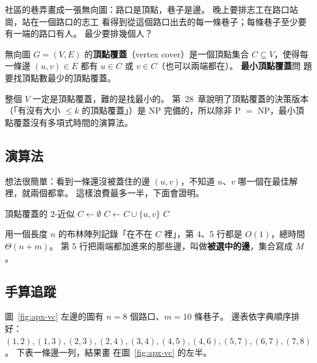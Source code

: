 社區的巷弄畫成一張無向圖：路口是頂點，巷子是邊。 晚上要排志工在路口站崗，站在一個路口的志工
看得到從這個路口出去的每一條巷子；每條巷子至少要有一端的路口有人。 最少要排幾個人？

\begin{definition}[頂點覆蓋]
\label{def:apx-vc}
無向圖 $G = (V, E)$ 的\textbf{頂點覆蓋}（vertex cover）是一個頂點集合 $C \subseteq V$，使得每
一條邊 $(u, v) \in E$ 都有 $u \in C$ 或 $v \in C$（也可以兩端都在）。 \textbf{最小頂點覆蓋}問
題要找頂點數最少的頂點覆蓋。
\end{definition}

整個 $V$ 一定是頂點覆蓋，難的是找最小的。 第~28~章說明了頂點覆蓋的決策版本（「有沒有大小
$\le k$ 的頂點覆蓋」）是 NP 完備的，所以除非 P $=$ NP，最小頂點覆蓋沒有多項式時間的演算法。

\subsection{演算法}

想法很簡單：看到一條還沒被蓋住的邊 $(u, v)$，不知道 $u$、$v$ 哪一個在最佳解裡，就兩個都拿。
這樣浪費最多一半，下面會證明。

\begin{pseudo}[label=alg:apx-vc]{頂點覆蓋的 $2$-近似}
    \State $C \gets \emptyset$
     
            \State $C \gets C \cup \{u, v\}$
        \EndIf
    \EndFor
    \State \Return $C$
\EndFunction
\end{pseudo}

用一個長度 $n$ 的布林陣列記錄「在不在 $C$ 裡」，第 4、5 行都是 $O(1)$，總時間 $\Theta(n + m)$。
第 5 行把兩端都加進來的那些邊，叫做\textbf{被選中的邊}，集合寫成 $M$。

\subsection{手算追蹤}

圖~\ref{fig:apx-vc} 左邊的圖有 $n = 8$ 個路口、$m = 10$ 條巷子。 邊表依字典順序排好：
$(1,2), (1,3), (2,3), (2,4), (3,4), (4,5), (4,6), (5,7), (6,7), (7,8)$。 下表一條邊一列，結果畫
在圖~\ref{fig:apx-vc} 的左半。

